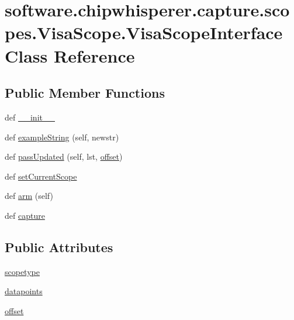 \hypertarget{classsoftware_1_1chipwhisperer_1_1capture_1_1scopes_1_1VisaScope_1_1VisaScopeInterface}{}\section{software.\+chipwhisperer.\+capture.\+scopes.\+Visa\+Scope.\+Visa\+Scope\+Interface Class Reference}
\label{classsoftware_1_1chipwhisperer_1_1capture_1_1scopes_1_1VisaScope_1_1VisaScopeInterface}
\subsection*{Public Member Functions}
\begin{DoxyCompactItemize}
\item 
def \hyperlink{classsoftware_1_1chipwhisperer_1_1capture_1_1scopes_1_1VisaScope_1_1VisaScopeInterface_a26c9cc9e8ab23c6d93e71c525ae4b596}{\+\_\+\+\_\+init\+\_\+\+\_\+}
\item 
def \hyperlink{classsoftware_1_1chipwhisperer_1_1capture_1_1scopes_1_1VisaScope_1_1VisaScopeInterface_a447032f3073a3e9505f6b2cd5fd0b4c3}{example\+String} (self, newstr)
\item 
def \hyperlink{classsoftware_1_1chipwhisperer_1_1capture_1_1scopes_1_1VisaScope_1_1VisaScopeInterface_a64d9ff4d852aac3c8bc29d9b4e3fb747}{pass\+Updated} (self, lst, \hyperlink{classsoftware_1_1chipwhisperer_1_1capture_1_1scopes_1_1VisaScope_1_1VisaScopeInterface_a9177aa778506d585aea4a57ea3fd8896}{offset})
\item 
def \hyperlink{classsoftware_1_1chipwhisperer_1_1capture_1_1scopes_1_1VisaScope_1_1VisaScopeInterface_aa2dc3dac7e05afc998a49fbf865b71f7}{set\+Current\+Scope}
\item 
def \hyperlink{classsoftware_1_1chipwhisperer_1_1capture_1_1scopes_1_1VisaScope_1_1VisaScopeInterface_aefa9cdb3d2b23be551007e6b736b7078}{arm} (self)
\item 
def \hyperlink{classsoftware_1_1chipwhisperer_1_1capture_1_1scopes_1_1VisaScope_1_1VisaScopeInterface_a371249b7552e1360ce6caebd32e28483}{capture}
\end{DoxyCompactItemize}
\subsection*{Public Attributes}
\begin{DoxyCompactItemize}
\item 
\hyperlink{classsoftware_1_1chipwhisperer_1_1capture_1_1scopes_1_1VisaScope_1_1VisaScopeInterface_aece91f171885b082ccbfe991b42ee053}{scopetype}
\item 
\hyperlink{classsoftware_1_1chipwhisperer_1_1capture_1_1scopes_1_1VisaScope_1_1VisaScopeInterface_ac4207839ddc47e180ef8a7de065cbe57}{datapoints}
\item 
\hyperlink{classsoftware_1_1chipwhisperer_1_1capture_1_1scopes_1_1VisaScope_1_1VisaScopeInterface_a9177aa778506d585aea4a57ea3fd8896}{offset}
\end{DoxyCompactItemize}


